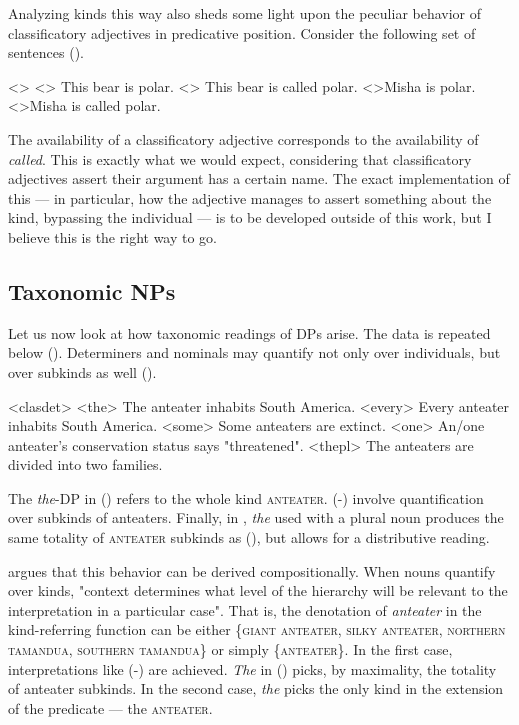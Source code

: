 \documentclass[a4paper, 12pt]{article}
\begin{document}
Analyzing kinds this way also sheds some light upon the peculiar behavior of classificatory adjectives in predicative position. Consider the following set of sentences (\nextx).

\pex<>
    \a<> This bear is polar.
    \a<> This bear is called polar.
    \a<>\ljudge*Misha is polar.
    \a<>\ljudge*Misha is called polar.
\xe

The availability of a classificatory adjective corresponds to the availability of \textit{called}. This is exactly what we would expect, considering that classificatory adjectives assert their argument has a certain name. The exact implementation of this --- in particular, how the adjective manages to assert something about the kind, bypassing the individual --- is to be developed outside of this work, but I believe this is the right way to go.

\subsection{Taxonomic NPs}

Let us now look at how taxonomic readings of DPs arise. The data is repeated below (\nextx). Determiners and nominals may quantify not only over individuals, but over subkinds as well (\nextx).

\pex<clasdet>
    \a<the> The anteater inhabits South America.
    \a<every> Every anteater inhabits South America.
    \a<some> Some anteaters are extinct.
    \a<one> An/one anteater's conservation status says "threatened".
    \a<thepl> The anteaters are divided into two families.
\xe

The \textit{the}-DP in () refers to the whole kind \textsc{anteater}. (-) involve quantification over subkinds of anteaters. Finally, in , \textit{the} used with a plural noun produces the same totality of \textsc{anteater} subkinds as (), but allows for a distributive reading.

\textcite{dayal2004numbermarkingdefiniteness} argues that this behavior can be derived compositionally. When nouns quantify over kinds, "context determines what level of the hierarchy will be relevant to the interpretation in a particular case". That is, the denotation of \textit{anteater} in the kind-referring function can be either \{\textsc{giant anteater, silky anteater, northern tamandua, southern tamandua}\} or simply \{\textsc{anteater}\}. In the first case, interpretations like (-) are achieved. \textit{The} in () picks, by maximality, the totality of anteater subkinds. In the second case, \textit{the} picks the only kind in the extension of the predicate --- the \textsc{anteater}.
\end{document}
